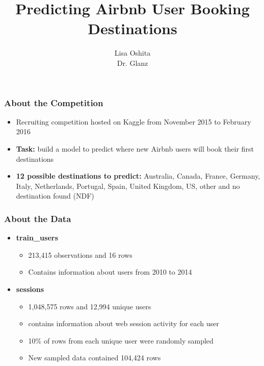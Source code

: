 \documentclass{beamer}
\title{Predicting Airbnb User Booking Destinations}
\author{Lisa Oshita\\Dr. Glanz}
\begin{document}
 
\frame{\titlepage}


\begin{frame}
\frametitle{About the Competition}
  \begin{itemize}
    \item Recruiting competition hosted on Kaggle from November 2015 to February 2016 \vspace{1ex}
    \item \textbf{Task:} build a model to predict where new Airbnb users will book their first destinations \vspace{1ex}
    \item \textbf{12 possible destinations to predict:} Australia, Canada, France, Germany, Italy, Netherlands, Portugal, Spain, United Kingdom, US, other and no destination found (NDF)
  \end{itemize}
\end{frame}


\begin{frame}
\frametitle{About the Data}
\begin{itemize}
  \item \textbf{train\_users} 
  \begin{itemize}
    \item 213,415 observations and 16 rows
    \item Contains information about users from 2010 to 2014 \vspace{2ex}
  \end{itemize}
  \item \textbf{sessions}
  \begin{itemize}
    \item 1,048,575 rows and 12,994 unique users
    \item contains information about web session activity for each user
    \item 10\% of rows from each unique user were randomly sampled
    \item New sampled data contained 104,424 rows  
  \end{itemize}
\end{itemize}
\end{frame}

\end{document}
